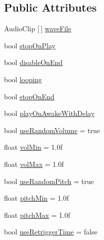 \subsection*{Public Attributes}
\begin{DoxyCompactItemize}
\item 
Audio\+Clip \mbox{[}$\,$\mbox{]} \mbox{\hyperlink{class_valve_1_1_v_r_1_1_interaction_system_1_1_play_sound_ac8133bd7a943717ea4f870ef8551ea2b}{wave\+File}}
\item 
bool \mbox{\hyperlink{class_valve_1_1_v_r_1_1_interaction_system_1_1_play_sound_a2bc66f59561606e0317b50a8fad66503}{stop\+On\+Play}}
\item 
bool \mbox{\hyperlink{class_valve_1_1_v_r_1_1_interaction_system_1_1_play_sound_a605dacc17d2f86ec35e501979fc1437e}{disable\+On\+End}}
\item 
bool \mbox{\hyperlink{class_valve_1_1_v_r_1_1_interaction_system_1_1_play_sound_ad1ecddeaad4cb12f7aea478b417d28fa}{looping}}
\item 
bool \mbox{\hyperlink{class_valve_1_1_v_r_1_1_interaction_system_1_1_play_sound_aa2fac8d14d4d59bc65c2cb64a5779fd7}{stop\+On\+End}}
\item 
bool \mbox{\hyperlink{class_valve_1_1_v_r_1_1_interaction_system_1_1_play_sound_a291b8176bcd3b8f78caf8d1dbaff2e54}{play\+On\+Awake\+With\+Delay}}
\item 
bool \mbox{\hyperlink{class_valve_1_1_v_r_1_1_interaction_system_1_1_play_sound_a224c211ba53c0ebd6d67112ad96870a9}{use\+Random\+Volume}} = true
\item 
float \mbox{\hyperlink{class_valve_1_1_v_r_1_1_interaction_system_1_1_play_sound_ae3529e8878deb7c7095938b0779637c9}{vol\+Min}} = 1.\+0f
\item 
float \mbox{\hyperlink{class_valve_1_1_v_r_1_1_interaction_system_1_1_play_sound_a82d3e0f326f58adb384d69f4f7d88131}{vol\+Max}} = 1.\+0f
\item 
bool \mbox{\hyperlink{class_valve_1_1_v_r_1_1_interaction_system_1_1_play_sound_ae753c7791561894e78fa9954fdc1c7d4}{use\+Random\+Pitch}} = true
\item 
float \mbox{\hyperlink{class_valve_1_1_v_r_1_1_interaction_system_1_1_play_sound_a2d1e3035a16cb6e439a93971ff9339b4}{pitch\+Min}} = 1.\+0f
\item 
float \mbox{\hyperlink{class_valve_1_1_v_r_1_1_interaction_system_1_1_play_sound_a694a8c7a1a1b8574fb9c5f0b3f2c28d4}{pitch\+Max}} = 1.\+0f
\item 
bool \mbox{\hyperlink{class_valve_1_1_v_r_1_1_interaction_system_1_1_play_sound_a8904107b7cffc6a9f741d3ce3911af04}{use\+Retrigger\+Time}} = false

\end{DoxyCompactItemize}
